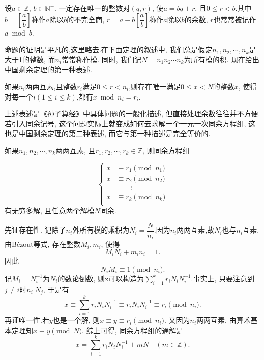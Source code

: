 \documentclass[color=green,mathpazo,titlestyle=hang]{elegantbook}
\begin{document}
  
\begin{newprop}[带余除法]
  设$a\in \mathbb{Z}$, $b\in \mathbb{N^+}$.	一定存在唯一的整数对$(q,r)$, 使$a=bq+r$, 且$0\leq r< b$.其中$b=\left[\dfrac{a}{b}\right]$称作$a$除以$b$的不完全商, $r=a-b\left[\dfrac{a}{b}\right]$称作$a$除以$b$的余数, $r$也常常被记作$a\bmod b$.
\end{newprop} 


\newpage

  命题的证明是平凡的,这里略去.在下面定理的叙述中, 我们总是假定$n_1,n_2,\cdots,n_k$是大于1的整数, 而$n_i$常常称作模. 同时, 我们记$N=n_1n_2\cdots n_k$为所有模的积. 现在给出中国剩余定理的第一种表述.
  
  
  \begin{newthem}[中国剩余定理I]
  	如果$n_i$两两互素,且整数$r_i$满足$0\leq r< n_i$,则存在唯一满足$0\leq x <N$的整数$x$, 使得对每一个$i(1\leq i \leq k)$,都有$x\bmod n_i=r_i$.
  \end{newthem}

  上述表述是《孙子算经》中具体问题的一般化描述, 但直接处理余数往往并不方便. 若引入同余记号, 这个问题实际上就变成如何去求解一个一元一次同余方程组, 这也是中国剩余定理的第二种表述, 而它与第一种描述是完全等价的.
  
  \begin{newthem}[中国剩余定理II]
  	如果$n_1,n_2,\cdots,n_k$两两互素, 且$r_1,r_2,\cdots,r_k \in \mathbb{Z}$, 则同余方程组
  
  	\begin{equation*}
  	\left\{                          
  	\begin{aligned}
  	x&\equiv r_1\pmod{n_1}\\
  	x&\equiv r_2\pmod{n_2}\\
  	 &\qquad \vdots\\ 
  	x&\equiv r_k\pmod{n_k}\\
  	\end{aligned}
  	\right.
  	\end{equation*}
  有无穷多解, 且任意两个解模$N$同余.	
  
  \end{newthem}


  \begin{newproof}
	先证存在性. 记除了$n_i$外所有模的乘积为$N_i=\dfrac{N}{n_i}$.因为$n_i$两两互素,故$N_i$也与$n_i$互素.由B\'{e}zout等式, 存在整数$M_i,m_i$, 使得
	\[
	M_iN_i+m_in_i=1.
	\]
	因此
	\[
	N_iM_i\equiv 1\pmod{n_i}.
	\]
	记$M_i=N_i^{-1}$为$N_i$的数论倒数, 则x可以构造为$\sum\limits_{i=1}^{k}r_iN_i N_i^{-1}$.事实上, 只要注意到$j\ne i$时$n_i|N_j$, 于是有
	\[
	x\equiv \sum_{i=1}^{k}r_iN_{i} N_i^{-1}\equiv r_iN_i N_i^{-1}\equiv r_i\pmod{n_i}.
	\]
	再证唯一性.若$y$也是一个解, 则$x\equiv y\equiv r_i\pmod{n_i}$. 又因为$n_i$两两互素, 由算术基本定理知$x\equiv y\pmod{N}$.
	综上可得, 同余方程组的通解是
	\begin{equation}
		x=\sum_{i=1}^{k}r_iN_i N_i^{-1}+mN \quad (m\in\mathbb{Z}).
	\end{equation}
  \end{newproof}
\end{document}

